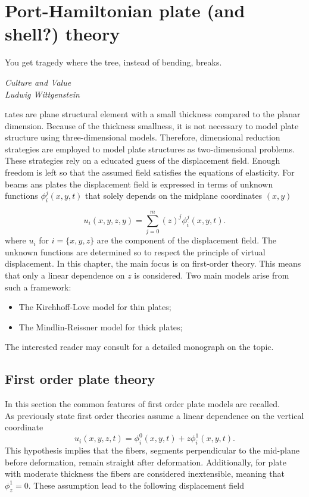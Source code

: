 \chapter{Port-Hamiltonian plate (and shell?) theory}

\epigraph{You get tragedy where the tree, instead of bending, breaks.}{\textit{Culture and Value\\
Ludwig Wittgenstein}}
\minitoc

\lettrine{\color{theme}{P}}lates are plane structural element with a small thickness compared to the planar dimension. Because of the thickness smallness, it is not necessary to model plate structure using three-dimensional models. Therefore, dimensional reduction strategies are employed to model plate structures as two-dimensional problems. These strategies rely on a educated guess of the displacement field. Enough freedom is left so that the assumed field satisfies the equations of elasticity. For beams ans plates the displacement field is expressed in terms of unknown functions $\phi_i^j(x,y,t)$ that solely depends on the midplane coordinates $(x,y)$

\[
u_i(x,y,z,y) = \sum_{j=0}^m (z)^j \phi_i^j(x,y,t).
\]
where $u_{i}$ for $i = \{x, y, z\}$ are the component of the displacement field. The unknown functions are determined so to respect the principle of virtual displacement. In this chapter, the main focus is on first-order theory. This means that only a linear dependence on $z$ is considered. Two main models arise from such a framework: 
\begin{itemize}
	\item The Kirchhoff-Love model for thin plates;
	\item The Mindlin-Reissner model for thick plates;
\end{itemize}
The interested reader may consult \cite{reddy2006theory} for a detailed monograph on the topic.

\section{First order plate theory}
In this section  the common features of first order plate models are recalled. \\

As previously state first order theories assume a linear dependence on the vertical coordinate
\[
u_i(x,y,z,t) = \phi_i^0(x,y,t) + z \phi_i^1(x,y,t).
\]
This hypothesis implies that the fibers, segments perpendicular to the mid-plane before deformation, remain straight after deformation. Additionally, for plate with moderate thickness the fibers are considered inextensible, meaning that $\phi_z^1 = 0$. These assumption lead to the following displacement field

